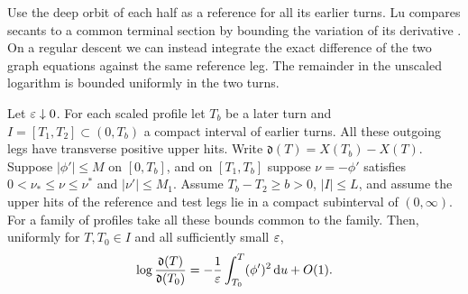 Use the deep orbit of each half as a reference for all its earlier
turns. Lu compares secants to a common terminal section by bounding
the variation of its derivative \cite[Lemma~3.4]{LuDegree}.
On a regular descent we can instead integrate the exact difference of
the two graph equations against the same reference leg. The remainder
in the unscaled logarithm is bounded uniformly in the two turns.

\begin{lemma}\label{lem:deficit-ratio}
Let $\varepsilon\downarrow0$. For each scaled profile let $T_b$ be a later turn
and $I=[T_1,T_2]\subset(0,T_b)$ a compact interval of earlier
turns. All these outgoing legs have transverse positive upper hits.
Write $\mathfrak d(T)=X(T_b)-X(T)$. Suppose $|\phi'|\le M$ on $[0,T_b]$,
and on $[T_1,T_b]$ suppose $\nu=-\phi'$ satisfies
$0<\nu_*\le\nu\le\nu^*$ and $|\nu'|\le M_1$. Assume
$T_b-T_2\ge b>0$, $|I|\le L$, and assume the upper hits of the
reference and test legs lie in a compact subinterval of $(0,\infty)$.
For a family of profiles take all these bounds common to the family.
Then, uniformly for $T,T_0\in I$ and all sufficiently small $\varepsilon$,
\begin{equation}\label{eq:deficit-ratio}
 \log\frac{\mathfrak d(T)}{\mathfrak d(T_0)}=-\frac{1}{\varepsilon}\int_{T_0}^{T}
 (\phi')^2\,\mathrm{d} u+O(1).
\end{equation}
\end{lemma}

